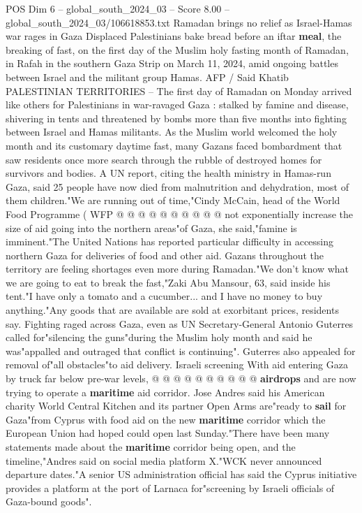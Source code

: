 \begin{textsample}{POS Dim 6 – global\_south\_2024\_03 – Score 8.00 – global\_south\_2024\_03/106618853.txt}  \label{ex:f6_pos_068}
Ramadan brings no relief as Israel-Hamas war rages in Gaza Displaced Palestinians bake bread before an iftar \textbf{meal}, the breaking of fast, on the first day of the Muslim holy fasting month of Ramadan, in Rafah in the southern Gaza Strip on March 11, 2024, amid ongoing battles between Israel and the militant group Hamas.
AFP / Said Khatib PALESTINIAN TERRITORIES -- The first day of Ramadan on Monday arrived like others for Palestinians in war-ravaged Gaza : stalked by famine and disease, shivering in tents and threatened by bombs more than five months into fighting between Israel and Hamas militants.
As the Muslim world welcomed the holy month and its customary daytime fast, many Gazans faced bombardment that saw residents once more search through the rubble of destroyed homes for survivors and bodies.
A UN report, citing the health ministry in Hamas-run Gaza, said 25 people have now died from malnutrition and dehydration, most of them children."We are running out of time,"Cindy McCain, head of the World Food Programme ( WFP @ @ @ @ @ @ @ @ @ @ not exponentially increase the size of aid going into the northern areas"of Gaza, she said,"famine is imminent."The United Nations has reported particular difficulty in accessing northern Gaza for deliveries of food and other aid.
Gazans throughout the territory are feeling shortages even more during Ramadan."We don't know what we are going to eat to break the fast,"Zaki Abu Mansour, 63, said inside his tent."I have only a tomato and a cucumber... and I have no money to buy anything."Any goods that are available are sold at exorbitant prices, residents say.
Fighting raged across Gaza, even as UN Secretary-General Antonio Guterres called for"silencing the guns"during the Muslim holy month and said he was"appalled and outraged that conflict is continuing".
Guterres also appealed for removal of"all obstacles"to aid delivery.
Israeli screening With aid entering Gaza by truck far below pre-war levels, @ @ @ @ @ @ @ @ @ @ \textbf{airdrops} and are now trying to operate a \textbf{maritime} aid corridor.
Jose Andres said his American charity World Central Kitchen and its partner Open Arms are"ready to \textbf{sail} for Gaza"from Cyprus with food aid on the new \textbf{maritime} corridor which the European Union had hoped could open last Sunday."There have been many statements made about the \textbf{maritime} corridor being open, and the timeline,"Andres said on social media platform X."WCK never announced departure dates."A senior US administration official has said the Cyprus initiative provides a platform at the port of Larnaca for"screening by Israeli officials of Gaza-bound goods".

\end{textsample}
